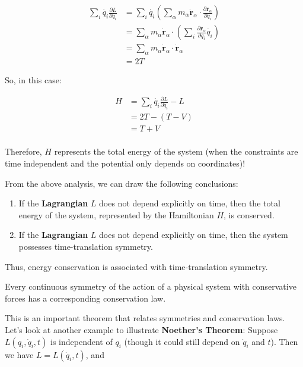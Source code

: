\begin{align*}
    \sum_i \dot{q_i} \frac{\partial L}{\partial \dot{q_i}} &= \sum_i \dot{q_i} \left(\sum_\alpha m_\alpha \dot{\mathbf{r}}_\alpha \cdot \frac{\partial \mathbf{r}_\alpha}{\partial q_i}\right) \\
    &= \sum_\alpha m_\alpha \dot{\mathbf{r}}_\alpha \cdot \left(\sum_i \frac{\partial \mathbf{r}_\alpha}{\partial q_i} \dot{q_i}\right) \\
    &= \sum_\alpha m_\alpha \dot{\mathbf{r}}_\alpha \cdot \dot{\mathbf{r}}_\alpha \\
    &= 2T
\end{align*}

So, in this case:

\begin{align*}
    H &= \sum_i \dot{q_i} \frac{\partial L}{\partial \dot{q_i}} - L \\
    &= 2T - \left(T - V\right) \\
    &= T + V \\
\end{align*}

Therefore, $H$ represents the total energy of the system (when the constraints are time independent and the potential only depends on coordinates)!

From the above analysis, we can draw the following conclusions:

\begin{enumerate}
    \item If the \textbf{Lagrangian} $L$ does not depend explicitly on time, then the total energy of the system, represented by the Hamiltonian $H$, is conserved.
    \item If the \textbf{Lagrangian} $L$ does not depend explicitly on time, then the system possesses time-translation symmetry.
\end{enumerate}

Thus, energy conservation is associated with time-translation symmetry.

\begin{definition}
 Every continuous symmetry of the action of a physical system with conservative forces has a corresponding conservation law.
\end{definition}

This is an important theorem that relates symmetries and conservation laws.
Let's look at another example to illustrate \textbf{Noether's Theorem}: Suppose 
$L(q_i, \dot{q}_i, t)$ is independent of $q_i$ (though it could still depend on 
$\dot{q}_i$ and $t$). Then we have $L = L(\dot{q}_i, t)$, and

